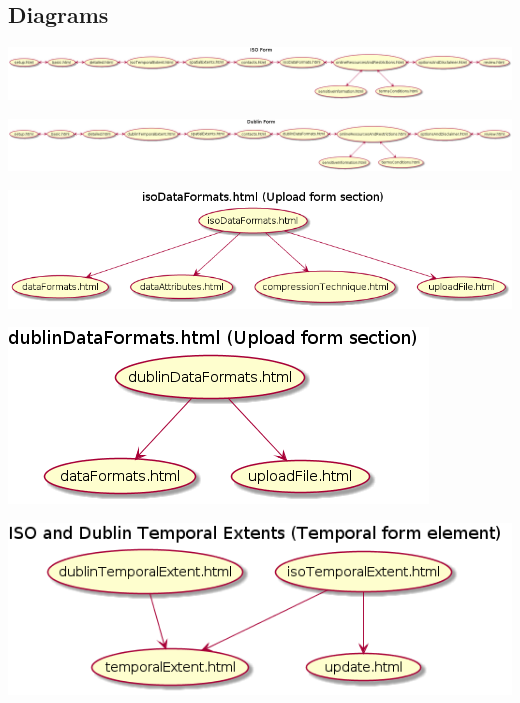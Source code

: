 \documentclass[a4paper, 12pt]{article}
\begin{document}
\subsection{Diagrams}

\includegraphics[scale=0.35, angle=-90]{iso-states}

\includegraphics[scale=0.35, angle=-90]{dublin-states.png}

\includegraphics[scale=0.5]{iso-data-formats.png}
\newline

\includegraphics[scale=0.5]{dublin-data-formats.png}
\newline

\includegraphics[scale=0.5]{temporal-extent.png}
\newline
\end{document}
